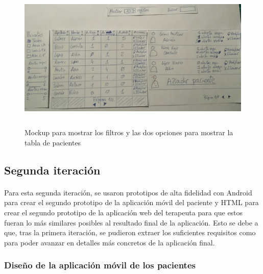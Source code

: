 \begin{figure}[H]
    \centering
    \includegraphics[width=0.8\linewidth, height=7cm]{Imagenes/04DescProblema/mockups/v1/web/09-mostrarEpisodios.jpg}
    \caption[Mockup para mostrar los filtros y las dos opciones para mostrar la tabla de pacientes]{Mockup para mostrar los filtros y las dos opciones para mostrar la tabla de pacientes}
    \label{c4:fig:v1:web:mostrarEpisodios}
\end{figure}

\subsection{Segunda iteración}

\paragraph{}
Para esta segunda iteración, se usaron prototipos de alta fidelidad con Android para crear el segundo prototipo de la aplicación móvil del paciente y HTML para crear el segundo prototipo de la aplicación web del terapeuta para que estos fueran lo más similares posibles al resultado final de la aplicación. Esto se debe a que, tras la primera iteración, se pudieron extraer los suficientes requisitos como para poder avanzar en detalles más concretos de la aplicación final.

\subsubsection{Diseño de la aplicación móvil de los pacientes}


